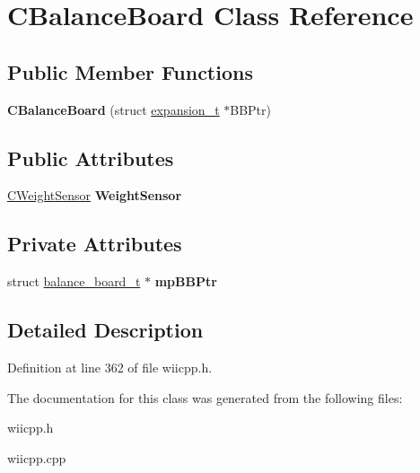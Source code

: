 \hypertarget{class_c_balance_board}{\section{\-C\-Balance\-Board \-Class \-Reference}
\label{class_c_balance_board}
}
\subsection*{\-Public \-Member \-Functions}
\begin{DoxyCompactItemize}
\item 
\hypertarget{class_c_balance_board_a11948fc65e72d912b341ebc866673c1c}{{\bfseries \-C\-Balance\-Board} (struct \hyperlink{structexpansion__t}{expansion\-\_\-t} $\ast$\-B\-B\-Ptr)}\label{class_c_balance_board_a11948fc65e72d912b341ebc866673c1c}

\end{DoxyCompactItemize}
\subsection*{\-Public \-Attributes}
\begin{DoxyCompactItemize}
\item 
\hypertarget{class_c_balance_board_a3b781ed33ad7255f557d4782728eb045}{\hyperlink{class_c_weight_sensor}{\-C\-Weight\-Sensor} {\bfseries \-Weight\-Sensor}}\label{class_c_balance_board_a3b781ed33ad7255f557d4782728eb045}

\end{DoxyCompactItemize}
\subsection*{\-Private \-Attributes}
\begin{DoxyCompactItemize}
\item 
\hypertarget{class_c_balance_board_a6e956dd27eede6e72c7d8459d0c15843}{struct \hyperlink{structbalance__board__t}{balance\-\_\-board\-\_\-t} $\ast$ {\bfseries mp\-B\-B\-Ptr}}\label{class_c_balance_board_a6e956dd27eede6e72c7d8459d0c15843}

\end{DoxyCompactItemize}


\subsection{\-Detailed \-Description}


\-Definition at line 362 of file wiicpp.\-h.



\-The documentation for this class was generated from the following files\-:\begin{DoxyCompactItemize}
\item 
wiicpp.\-h\item 
wiicpp.\-cpp\end{DoxyCompactItemize}
